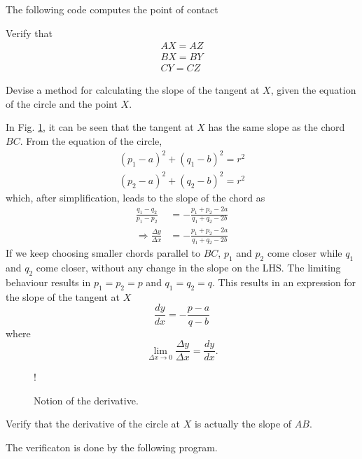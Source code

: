 \documentclass[journal,12pt,twocolumn]{IEEEtran}
\begin{document}
\solution
The following code computes the point of contact 

\begin{problem}
Verify that
\begin{align}
AX = AZ
\\
BX = BY
\\
CY = CZ
\end{align}
\end{problem}
\begin{problem}
Devise a method for calculating the slope of the tangent at $X$, given the equation of the circle and the point $X$.
\end{problem}
\solution In Fig. \ref{fig:derivative}, it can be seen that the tangent at $X$ has the same slope as the chord $BC$.
From the equation of the circle, 
\begin{align}
(p_{1}-a)^{2}+(q_{1} -b)^{2} =r^{2}   
\\
(p_{2}-a) ^{2}+(q_{2} -b)^{2} =r^{2}  
\end{align}
which, after simplification, leads to the slope of the chord as
\begin{align}
\frac{q _{1}-q_{2}}{p_{1}-p_{2}}  &=  -\frac{p_{1}+p_{2}-2a}{q_{1}+q_{2}-2b}
\\
\Rightarrow \frac{\Delta y}{\Delta x}  &=  -\frac{p_{1}+p_{2}-2a}{q_{1}+q_{2}-2b}
\end{align}
%
If we keep choosing smaller chords parallel to $BC$, $p_1$ and $p_2$ come closer while $q_1$ and $q_2$ come closer, without
any change in the slope on the LHS.  The limiting behaviour results in $p_1=p_2=p$ and $q_1=q_2=q$.  This results
in an expression for the slope of the tangent at $X$
\begin{equation}
\frac{dy}{dx}=-\frac{{p}-{a}}{{q}-{b}}
\end{equation}
where
\begin{equation}
\lim_{\Delta x \rightarrow 0} \frac{\Delta y}{\Delta x} = \frac{dy}{dx}.
\end{equation}
\begin{figure}[!h]
\centering
\resizebox {\columnwidth} {!} {

}
\caption{Notion of the derivative.}
\label{fig:derivative}
\end{figure}
%
\begin{problem}
Verify that the derivative of the circle at $X$ is actually the slope of $AB$.
\end{problem}
%
\solution The verificaton is done by the following program.

\end{document}
